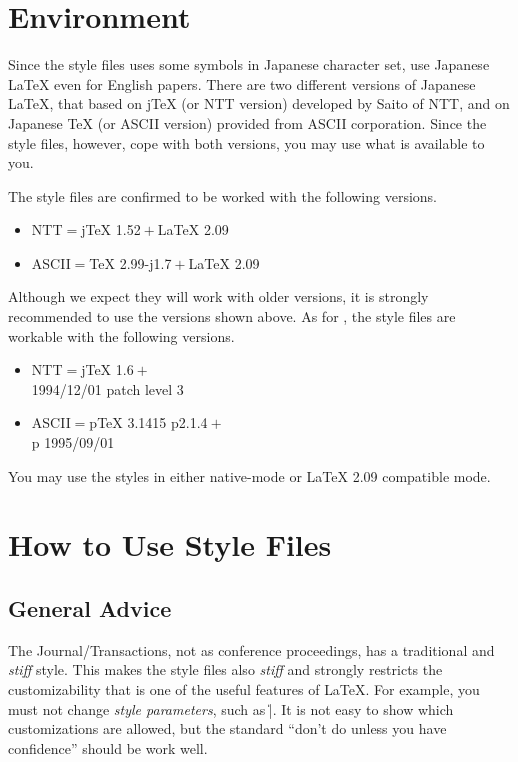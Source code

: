 
\section{{\protect\LATex} Environment}\label{sec:item}

Since the style files uses some symbols in Japanese character set, use
Japanese {\LaTeX} even for English papers.  There are two different versions
of Japanese {\LaTeX}, that based on j{\TeX} (or NTT version) developed by
Saito of NTT, and on Japanese {\TeX} (or ASCII version) provided from ASCII
corporation.  Since the style files, however, cope with both versions, you
may use what is available to you.

The style files are confirmed to be worked with the following versions.
%
\begin{itemize}%
\item
NTT${}={}${j\TeX} 1.52${}+{}${\LaTeX} 2.09
\item 
ASCII${}={}${\TeX} 2.99-j1.7${}+{}${\LaTeX} 2.09
\end{itemize}%
%
Although we expect they will work with older versions, it is strongly
recommended to use the versions shown above.  As for {\LATEXe}, the
style files are workable with the following versions.
%
\begin{itemize}%
\item
NTT${}={}${j\TeX} 1.6${}+{}$%
\ifDS@draft\else\\\fi
	{\LATEXe} 1994/12/01 patch level 3
\item 
ASCII${}={}${p\TeX} 3.1415 p2.1.4${}+{}$%
\ifDS@draft\else\\\fi
	{p\LATEXe} 1995/09/01
\end{itemize}%
%
You may use the styles in either native-mode or {\LaTeX} 2.09 compatible
mode.


\section{How to Use Style Files}
\subsection{General Advice}

The Journal\slash Transactions, not as conference proceedings, has a
traditional and {\em stiff} style.  This makes the style files also {\em
stiff} and strongly restricts the customizability that is one of the useful
features of {\LaTeX}.  For example, you must not change {\em style
parameters}, such as \|\texheight|.  It is not easy to show which
customizations are allowed, but the standard ``don't do unless you have
confidence'' should be work well.

